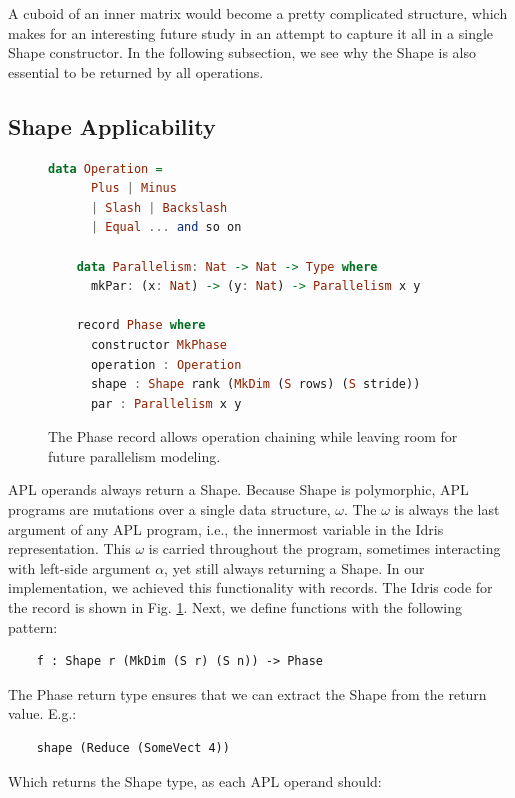 \documentclass{report}
\begin{document}
A cuboid of an inner matrix would become a pretty complicated structure, which makes for an interesting future study in an attempt to capture it all in a single Shape constructor. In the following subsection, we see why the Shape is also essential to be returned by all operations.

\subsection{Shape Applicability}

\begin{figure}
\begin{lstlisting}[language=Haskell]
    data Operation =
      Plus | Minus
      | Slash | Backslash
      | Equal ... and so on

    data Parallelism: Nat -> Nat -> Type where
      mkPar: (x: Nat) -> (y: Nat) -> Parallelism x y

    record Phase where
      constructor MkPhase
      operation : Operation
      shape : Shape rank (MkDim (S rows) (S stride))
      par : Parallelism x y
\end{lstlisting}
\caption{The Phase record allows operation chaining while leaving room for future parallelism modeling.}
\label{fig:record}
\end{figure}

APL operands always return a Shape. Because Shape is polymorphic, APL programs are mutations over a single data structure, $\omega$. The $\omega$ is always the last argument of any APL program, i.e., the innermost variable in the Idris representation. This $\omega$ is carried throughout the program, sometimes interacting with left-side argument $\alpha$, yet still always returning a Shape. In our implementation, we achieved this functionality with records. The Idris code for the record is shown in Fig. \ref{fig:record}. Next, we define functions with the following pattern:

\begin{verbatim}
    f : Shape r (MkDim (S r) (S n)) -> Phase
\end{verbatim}

The Phase return type ensures that we can extract the Shape from the return value. E.g.:

\begin{verbatim}
    shape (Reduce (SomeVect 4))
\end{verbatim}

Which returns the Shape type, as each APL operand should:
\end{document}
